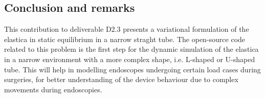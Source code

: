 \subsection{Conclusion and remarks}

This contribution to deliverable D2.3 presents a variational formulation of the elastica in static equilibrium in a narrow straght tube. The open-source code related to this problem is the first step for the dynamic simulation of the elastica in a narrow environment with a more complex shape, i.e. L-shaped or U-shaped tube. This will help in modelling endoscopes undergoing certain load cases during surgeries, for better understanding of the device behaviour due to complex movements during endoscopies.
